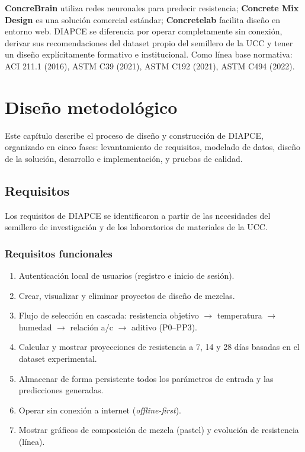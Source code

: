 \documentclass[12pt, letterpaper]{article}
\begin{document}
\textbf{ConcreBrain} utiliza redes neuronales para predecir resistencia; \textbf{Concrete Mix Design} es una solución comercial estándar; \textbf{Concretelab} facilita diseño en entorno web. DIAPCE se diferencia por operar completamente sin conexión, derivar sus recomendaciones del dataset propio del semillero de la UCC y tener un diseño explícitamente formativo e institucional. Como línea base normativa: ACI 211.1 (2016), ASTM C39 (2021), ASTM C192 (2021), ASTM C494 (2022).

\newpage
\section{Diseño metodológico}

Este capítulo describe el proceso de diseño y construcción de DIAPCE, organizado en cinco fases: levantamiento de requisitos, modelado de datos, diseño de la solución, desarrollo e implementación, y pruebas de calidad.

\subsection{Requisitos}

Los requisitos de DIAPCE se identificaron a partir de las necesidades del semillero de investigación y de los laboratorios de materiales de la UCC.

\subsubsection*{Requisitos funcionales}
\begin{enumerate}
    \item Autenticación local de usuarios (registro e inicio de sesión).
    \item Crear, visualizar y eliminar proyectos de diseño de mezclas.
    \item Flujo de selección en cascada: resistencia objetivo $\rightarrow$ temperatura $\rightarrow$ humedad $\rightarrow$ relación a/c $\rightarrow$ aditivo (P0--PP3).
    \item Calcular y mostrar proyecciones de resistencia a 7, 14 y 28 días basadas en el dataset experimental.
    \item Almacenar de forma persistente todos los parámetros de entrada y las predicciones generadas.
    \item Operar sin conexión a internet (\textit{offline-first}).
    \item Mostrar gráficos de composición de mezcla (pastel) y evolución de resistencia (línea).
\end{enumerate}
\end{document}
